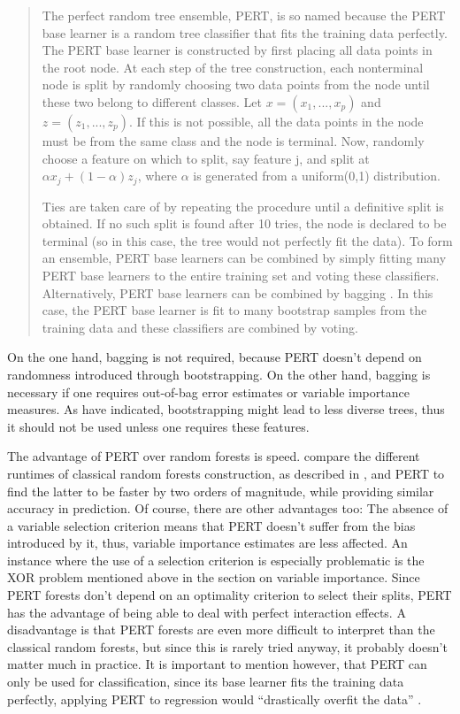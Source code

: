 \documentclass[a4paper,man,12pt,apacite,floatsintext,draftfirst]{apa6} %
\begin{document}
\begin{quotation}
The perfect random tree ensemble, PERT, is so named because the PERT base
learner is a random tree classifier that fits the training data perfectly.
The PERT base learner is constructed by first placing all data points in
the root node.
At each step of the tree construction, each nonterminal node is split by
randomly choosing two data points from the node until these two belong to
different classes.
Let \( x = (x_{1} , . . . , x_{p} ) \) and \( z = (z_{1} , . . . , z_{p} ) \).
If this is not possible, all the data points in the node must be from the
same class and the node is terminal.
Now, randomly choose a feature on which to split, say feature j, and split
at \( \alpha x_{j} + (1 - \alpha) z_{j} \), where \( \alpha \) is generated
from a uniform(0,1) distribution.

Ties are taken care of by repeating the procedure until a definitive
split is obtained.
If no such split is found after 10 tries, the node is declared to be
terminal (so in this case, the tree would not perfectly fit the data).
To form an ensemble, PERT base learners can be combined by simply fitting
many PERT base learners to the entire training set and voting these
classifiers.
Alternatively, PERT base learners can be combined by bagging
\cite{breiman1996bagging}.
In this case, the PERT base learner is fit to many bootstrap samples
from the training data and these classifiers are combined by voting.
\end{quotation}

On the one hand, bagging is not required, because PERT doesn't depend on
randomness introduced through bootstrapping.
On the other hand, bagging is necessary if one requires out-of-bag
error estimates or variable importance measures.
As \cite{liu2005maximizing} have indicated, bootstrapping might lead
to less diverse trees, thus it should not be used unless one requires
these features.

The advantage of PERT over random forests is speed.
\cite{cutler2001pert} compare the different runtimes of classical random
forests construction, as described in \cite{breiman2001random}, and PERT
to find the latter to be faster by two orders of magnitude,
while providing similar accuracy in prediction.
Of course, there are other advantages too:
The absence of a variable selection criterion means that PERT doesn't suffer
from the bias introduced by it, thus, variable importance estimates are less
affected.
An instance where the use of a selection criterion is especially problematic
is the XOR problem mentioned above in the section on variable importance.
Since PERT forests don't depend on an optimality criterion to select their
splits, PERT has the advantage of being able to deal with perfect
interaction effects.
A disadvantage is that PERT forests are even more difficult to interpret than
the classical random forests, but since this is rarely tried anyway,
it probably doesn't matter much in practice.
It is important to mention however, that PERT can only be used for
classification,
since its base learner fits the training data perfectly, applying PERT to
regression would “drastically overfit the data” \cite{cutler2001pert}.
\end{document}
